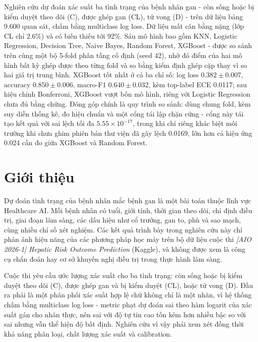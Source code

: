 \documentclass[12pt]{template/ai_conquer2026}
\begin{document}
Nghiên cứu dự đoán xác suất ba tình trạng của bệnh nhân gan - còn sống hoặc bị
kiểm duyệt theo dõi (C), được ghép gan (CL), tử vong (D) - trên dữ liệu bảng 9.600
quan sát, chấm bằng multiclass log loss. Dữ liệu mất cân bằng nặng (lớp CL chỉ
2.6\%) và có biến thiếu tới 92\%. Sáu mô hình bao gồm KNN, Logistic Regression, Decision
Tree, Naive Bayes, Random Forest, XGBoost - được so sánh trên cùng một bộ 5-fold
phân tầng cố định (seed 42), nhờ đó điểm của hai mô hình bất kỳ ghép được theo
từng fold và so bằng kiểm định ghép cặp thay vì so hai giá trị trung bình. XGBoost
tốt nhất ở cả ba chỉ số: log loss $0.382\pm0.007$, accuracy $0.850\pm0.006$,
macro-F1 $0.640\pm0.032$, kèm top-label ECE 0.0117; sau hiệu chỉnh Bonferroni,
XGBoost vượt bốn mô hình, riêng với Logistic Regression chưa đủ bằng chứng. Đóng
góp chính là quy trình so sánh: dùng chung fold, kèm suy diễn thống kê, đo hiệu
chuẩn và một cổng tái lập chặn cứng - cổng này tái tạo kết quả với sai lệch tối đa
$5.55\times10^{-17}$, trong khi chỉ riêng khác biệt môi trường khi chưa ghim phiên
bản thư viện đã gây lệch 0.0169, lớn hơn cả hiệu ứng 0.024 cần đo giữa XGBoost và
Random Forest.

\newpage
\setcounter{tocdepth}{2}
\tableofcontents
\thispagestyle{fancy}
\newpage
\hypersetup{pageanchor=true}
\section{Giới thiệu}

Dự đoán tình trạng của bệnh nhân mắc bệnh gan là một bài toán thuộc lĩnh
vực Healthcare AI. Mỗi bệnh nhân có tuổi, giới tính, thời gian theo dõi, chỉ định
điều trị, giai đoạn lâm sàng, các dấu hiệu như cổ trướng, gan to, phù và sao mạch,
cùng nhiều chỉ số xét nghiệm. Các kết quả trình bày trong nghiên cứu này chỉ phản ánh hiệu năng của các phương
pháp học máy trên bộ dữ liệu cuộc thi \textit{[AIO 2026-1] Hepatic Risk Outcome
Prediction} (Kaggle), và không được xem là công cụ chẩn đoán hay cơ sở khuyến
nghị điều trị trong thực hành lâm sàng.

Cuộc thi yêu cầu ước lượng xác suất
cho ba tình trạng: còn sống hoặc bị kiểm duyệt theo dõi (C), được ghép gan và bị kiểm
duyệt (CL), hoặc tử vong (D). Đầu ra phải là một phân phối xác suất hợp lệ chứ
không chỉ là một nhãn, vì hệ thống chấm bằng multiclass log loss - metric phạt dự
đoán sai theo hàm logarit của xác suất gán cho nhãn thực, nên sai với độ tự tin
cao tốn kém hơn nhiều bậc so với sai nhưng vẫn thể hiện độ bất định. Nghiên cứu vì
vậy phải xem xét đồng thời khả năng phân loại, chất lượng xác suất và calibration.
\end{document}
